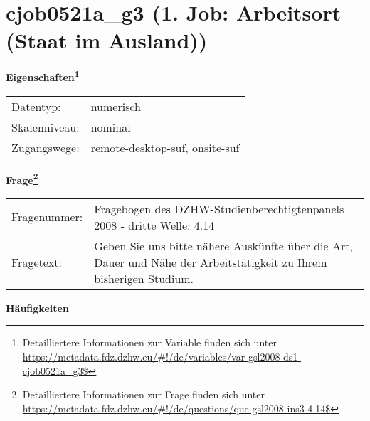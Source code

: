 
    \setcounter{footnote}{0}

    \vspace*{-1.8cm}
	\section{cjob0521a\_g3 (1. Job: Arbeitsort (Staat im Ausland))}
	\label{section:cjob0521a_g3}



    \vspace*{0.5cm}
    \noindent\textbf{Eigenschaften\footnote{Detailliertere Informationen zur Variable finden sich unter
		\url{https://metadata.fdz.dzhw.eu/\#!/de/variables/var-gsl2008-ds1-cjob0521a_g3$}}}\\
	\begin{tabularx}{\hsize}{@{}lX}
	Datentyp: & numerisch \\
	Skalenniveau: & nominal \\
	Zugangswege: &
	  remote-desktop-suf, 
	  onsite-suf
 \\
    \end{tabularx}



				\vspace*{0.5cm}
                \noindent\textbf{Frage\footnote{Detailliertere Informationen zur Frage finden sich unter
		              \url{https://metadata.fdz.dzhw.eu/\#!/de/questions/que-gsl2008-ins3-4.14$}}}\\
				\begin{tabularx}{\hsize}{@{}lX}
					Fragenummer: &
					  Fragebogen des DZHW-Studienberechtigtenpanels 2008 - dritte Welle:
					  4.14
 \\
					Fragetext: & Geben Sie uns bitte nähere Auskünfte über die Art, Dauer und Nähe der Arbeitstätigkeit zu Ihrem bisherigen Studium. \\
				\end{tabularx}





        		\vspace*{0.5cm}
                \noindent\textbf{Häufigkeiten}


